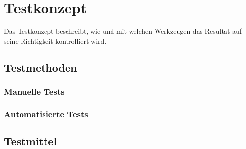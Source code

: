\section{Testkonzept}
\label{sec:testkonzept}
Das Testkonzept beschreibt, wie und mit welchen Werkzeugen das Resultat auf seine Richtigkeit kontrolliert wird.

\subsection{Testmethoden}
\subsubsection{Manuelle Tests}
\subsubsection{Automatisierte Tests}

\subsection{Testmittel}
